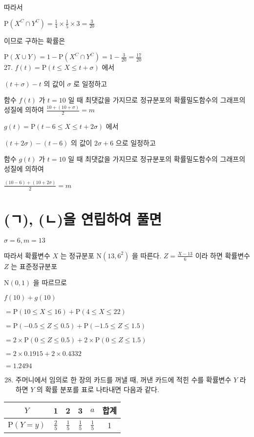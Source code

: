 \documentclass[10pt]{article}
\begin{document}
따라서

\(\mathrm{P}\left(X^{C} \cap Y^{C}\right)=\frac{1}{4} \times \frac{1}{5} \times 3=\frac{3}{20}\)

이므로 구하는 확률은

\(\mathrm{P}(X \cup Y)=1-\mathrm{P}\left(X^{C} \cap Y^{C}\right)=1-\frac{3}{20}=\frac{17}{20}\)\\
27. \(f(t)=\mathrm{P}(t \leq X \leq t+\sigma)\) 에서

\((t+\sigma)-t\) 의 값이 \(\sigma\) 로 일정하고

함수 \(f(t)\) 가 \(t=10\) 일 때 최댓값을 가지므로 정규분포의 확률밀도함수의 그래프의 성질에 의하여 \(\frac{10+(10+\sigma)}{2}=m\)

\(g(t)=\mathrm{P}(t-6 \leq X \leq t+2 \sigma)\) 에서

\((t+2 \sigma)-(t-6)\) 의 값이 \(2 \sigma+6\) 으로 일정하고

함수 \(g(t)\) 가 \(t=10\) 일 때 최댓값을 가지므로 정규분포의 확률밀도함수의 그래프의 성질에 의하여

\(\frac{(10-6)+(10+2 \sigma)}{2}=m\)

\section*{(ㄱ), (ㄴ)을 연립하여 풀면}
\(\sigma=6, m=13\)

따라서 확률변수 \(X\) 는 정규분포 \(\mathrm{N}\left(13,6^{2}\right)\) 을 따른다. \(Z=\frac{X-13}{6}\) 이라 하면 확률변수 \(Z\) 는 표준정규분포

\(\mathrm{N}(0,1)\) 을 따르므로

\(f(10)+g(10)\)

\(=\mathrm{P}(10 \leq X \leq 16)+\mathrm{P}(4 \leq X \leq 22)\)

\(=\mathrm{P}(-0.5 \leq Z \leq 0.5)+\mathrm{P}(-1.5 \leq Z \leq 1.5)\)

\(=2 \times \mathrm{P}(0 \leq Z \leq 0.5)+2 \times \mathrm{P}(0 \leq Z \leq 1.5)\)

\(=2 \times 0.1915+2 \times 0.4332\)

\(=1.2494\)

\begin{enumerate}
  \setcounter{enumi}{27}
  \item 주머니에서 임의로 한 장의 카드를 꺼낼 때, 꺼낸 카드에 적힌 수를 확률변수 \(Y\) 라 하면 \(Y\) 의 확률 분포를 표로 나타내면 다음과 같다.
\end{enumerate}

\begin{center}
\begin{tabular}{|c|c|c|c|c|c|}
\hline
\(Y\) & 1 & 2 & 3 & \(a\) & 합계 \\
\hline
\(\mathrm{P}(Y=y)\) & \(\frac{2}{5}\) & \(\frac{1}{5}\) & \(\frac{1}{5}\) & \(\frac{1}{5}\) & 1 \\
\hline
\end{tabular}
\end{center}
\end{document}
